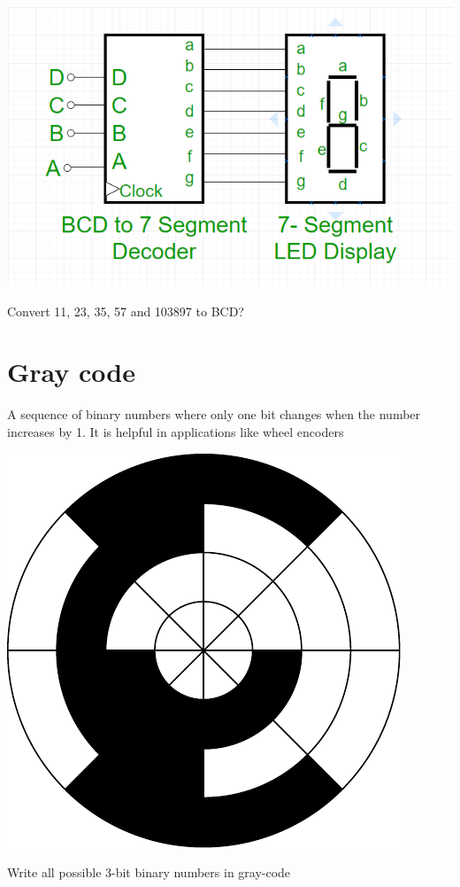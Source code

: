 \includegraphics[width=0.5\linewidth]{bcdto7seg.png}

\begin{prob}
  Convert 11, 23, 35, 57 and 103897 to BCD?
\end{prob}
\vspace{10em}

\section{Gray code}
A sequence of binary numbers where only one bit changes when the number
increases by 1. It is helpful in applications like wheel encoders

\includegraphics[width=0.5\linewidth]{gray-code.pdf}

\begin{prob}
  Write all possible 3-bit binary numbers in gray-code
\end{prob}
\vspace{10em}